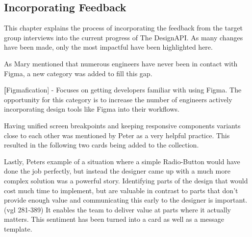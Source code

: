 \newpage
\subsection{Incorporating Feedback}
This chapter explains the process of incorporating the feedback from the target group interviews
into the current progress of The DesignAPI. As many changes have been made, only the most impactful
have been highlighted here.

As Mary mentioned that numerous engineers have never been in contact with Figma, a new category was
added to fill this gap.

\textbf[Figmafication] - Focuses on getting developers familiar with using Figma. The
opportunity for this category is to increase the number of engineers actively
incorporating design tools like Figma into their workflows.

Having unified screen breakpoints and keeping responsive components variants close to each other was
mentioned by Peter as a very helpful practice. This resulted in the following two cards being added
to the collection. 

Lastly, Peters example of a situation where a simple Radio-Button would have done the job perfectly,
but instead the designer came up with a much more complex solution was a powerful story. 
Identifying parts of the design that would cost much time to implement, but are valuable in contrast
to parts that don't provide enough value and communicating this early to the designer is important.
(vgl 281-389)
It enables the team to deliver value at parts where it actually matters. This sentiment has been
turned into a card as well as a message template.
